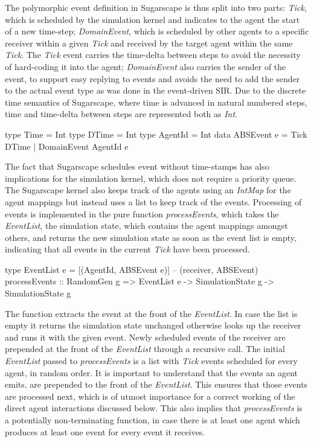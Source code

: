 The polymorphic event definition in Sugarscape is thus split into two parts: \textit{Tick}, which is scheduled by the simulation kernel and indicates to the agent the start of a new time-step; \textit{DomainEvent}, which is scheduled by other agents to a specific receiver within a given \textit{Tick} and received by the target agent within the same \textit{Tick}. The \textit{Tick} event carries the time-delta between steps to avoid the necessity of hard-coding it into the agent; \textit{DomainEvent} also carries the sender of the event, to support easy replying to events and avoids the need to add the sender to the actual event type as was done in the event-driven SIR. Due to the discrete time semantics of Sugarscape, where time is advanced in natural numbered steps, time and time-delta between steps are represented both as \textit{Int}.

\begin{HaskellCode}
type Time       = Int
type DTime      = Int
type AgentId    = Int
data ABSEvent e = Tick DTime | DomainEvent AgentId e
\end{HaskellCode}

The fact that Sugarscape schedules event without time-stamps has also implications for the simulation kernel, which does not require a priority queue. The Sugarscape kernel also keeps track of the agents using an \textit{IntMap} for the agent mappings but instead uses a list to keep track of the events. Processing of events is implemented in the pure function \textit{processEvents}, which takes the \textit{EventList}, the simulation state, which contains the agent mappings amongst others, and returns the new simulation state as soon as the event list is empty, indicating that all events in the current \textit{Tick} have been processed.

\begin{HaskellCode}
type EventList e = [(AgentId, ABSEvent e)] -- (receiver, ABSEvent)
processEvents :: RandomGen g => EventList e -> SimulationState g -> SimulationState g
\end{HaskellCode}

The function extracts the event at the front of the \textit{EventList}. In case the list is empty it returns the simulation state unchanged otherwise looks up the receiver and runs it with the given event. Newly scheduled events of the receiver are prepended at the front of the \textit{EventList} through a recursive call. The initial \textit{EventList} passed to \textit{processEvents} is a list with \textit{Tick} events scheduled for every agent, in random order. It is important to understand that the events an agent emits, are prepended to the front of the \textit{EventList}. This ensures that those events are processed next, which is of utmost importance for a correct working of the direct agent interactions discussed below. This also implies that \textit{processEvents} is a potentially non-terminating function, in case there is at least one agent which produces at least one event for every event it receives.

